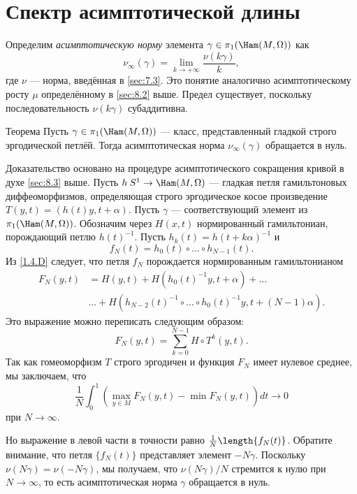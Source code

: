 \section{Спектр асимптотической длины}\label{sec:11.2}

Определим \emph{асимптотическую норму} элемента $\gamma\in\pi_1(\Ham(M, \Omega))$ как
\[\nu_\infty(\gamma)=\lim_{k\to+\infty}\frac{\nu(k\gamma)}{k},\]
где $\nu$ --- норма, введённая в \ref{sec:7.3}. 
Это понятие аналогично асимптотическому росту $\mu$ определённому в \ref{sec:8.2} выше.
Предел существует, поскольку последовательность $\nu(k\gamma)$ субаддитивна.

\begin{thm}{Теорема}\label{11.2.A}
Пусть $\gamma\in\pi_1(\Ham(M,\Omega))$ --- класс, представленный
гладкой строго эргодической петлёй.
Тогда асимптотическая норма $\nu_\infty (\gamma)$ обращается в нуль.
\end{thm}

Доказательство основано на процедуре асимптотического сокращения кривой в духе \ref{sec:8.3} выше.
Пусть $h\: S^1 \to \Ham(M,\Omega)$ --- гладкая петля гамильтоновых диффеоморфизмов, определяющая строго эргодическое косое произведение $T(y, t) = (h(t)y, t+\alpha)$.
Пусть $\gamma$ --- соответствующий элемент из $\pi_1(\Ham(M, \Omega))$.
Обозначим через $H(x, t)$ нормированный гамильтониан, порождающий петлю $h(t)^{-1}$.
Пусть $h_k(t) = h(t + k\alpha)^{-1}$ и  
\[f_N(t) = h_0(t) \circ \dots \circ h_{N-1}(t).\]
Из \ref{1.4.D} следует, что петля $f_N$ порождается нормированным гамильтонианом 
\begin{align*}
F_N(y,t)
&=
H(y,t)
+ H(h_0(t)^{-1}y,t+\alpha)
+\dots
\\
&\dots
+
H(h_{N-2} (t)^{-1} \circ \dots\circ h_0(t)^{-1}y, t + (N - 1)\alpha).
\end{align*}
Это выражение можно переписать следующим образом:
\[F_N(y, t) = \sum_{k=0}^{N-1} H\circ T^k(y, t).\]
Так как гомеоморфизм $T$ строго эргодичен и функция $F_N$ имеет
нулевое среднее, мы заключаем, что 
\[\frac1N\int_0^1\left(\max_{y\in M}F_N(y, t) - \min F_N(y, t)\right) dt \to 0\]
при $N \to \infty$.

Но выражение в левой части в точности равно $\frac1N\length\{f_N(t)\}$.
Обратите внимание, что петля $\{f_N(t)\}$ представляет элемент $-N\gamma$.
Поскольку $\nu(N\gamma) = \nu(-N\gamma)$, мы получаем, что
$\nu(N\gamma)/N$ стремится к нулю при $N \to \infty$, 
то есть асимптотическая норма $\gamma$ обращается в нуль.
\qeds
{}

